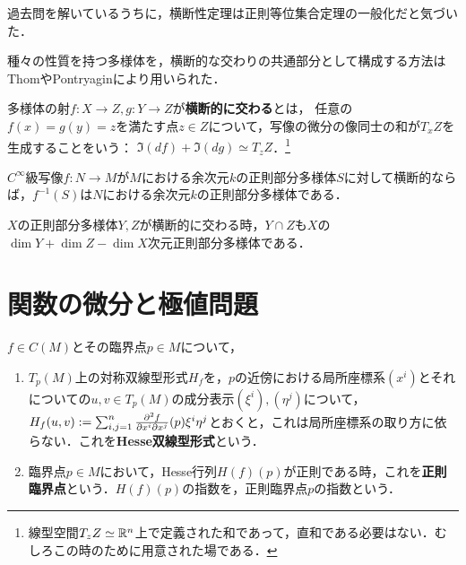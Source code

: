 \documentclass[uplatex,dvipdfmx]{jsreport}
\begin{document}
\begin{tcolorbox}[colframe=ForestGreen, colback=ForestGreen!10!white,breakable,colbacktitle=ForestGreen!40!white,coltitle=black,fonttitle=\bfseries\sffamily,
title=]
    過去問を解いているうちに，横断性定理は正則等位集合定理の一般化だと気づいた．
\end{tcolorbox}

\begin{tcolorbox}[colframe=ForestGreen, colback=ForestGreen!10!white,breakable,colbacktitle=ForestGreen!40!white,coltitle=black,fonttitle=\bfseries\sffamily,
    title=]
    種々の性質を持つ多様体を，横断的な交わりの共通部分として構成する方法はThomやPontryaginにより用いられた．
\end{tcolorbox}

\begin{definition}[transversality]
    多様体の射$f:X\to Z,g:Y\to Z$が\textbf{横断的に交わる}とは，
    任意の$f(x)=g(y)=z$を満たす点$z\in Z$について，写像の微分の像同士の和が$T_xZ$を生成することをいう：
    $\Im(df)+\Im(dg)\simeq T_zZ$．\footnote{線型空間$T_zZ\simeq\mathbb{R}^n$上で定義された和であって，直和である必要はない．むしろこの時のために用意された場である．}
\end{definition}

\begin{theorem}
    $C^\infty$級写像$f:N\to M$が$M$における余次元$k$の正則部分多様体$S$に対して横断的ならば，$f^{-1}(S)$は$N$における余次元$k$の正則部分多様体である．
\end{theorem}

\begin{theorem}
    $X$の正則部分多様体$Y,Z$が横断的に交わる時，$Y\cap Z$も$X$の$\dim Y+\dim Z-\dim X$次元正則部分多様体である．
\end{theorem}

\section{関数の微分と極値問題}

\begin{definition}
    $f\in C(M)$とその臨界点$p\in M$について，
    \begin{enumerate}
        \item $T_p(M)$上の対称双線型形式$H_f$を，$p$の近傍における局所座標系$(x^i)$とそれについての$u,v\in T_p(M)$の成分表示$(\xi^i),(\eta^j)$について，
        $H_f(u,v):=\sum^n_{i,j=1}\frac{\partial ^2f}{\partial x^i\partial x^j}(p)\xi^i\eta^j$とおくと，これは局所座標系の取り方に依らない．これを\textbf{Hesse双線型形式}という．
        \item 臨界点$p\in M$において，Hesse行列$H(f)(p)$が正則である時，これを\textbf{正則臨界点}という．$H(f)(p)$の指数を，正則臨界点$p$の指数という．
    \end{enumerate}
\end{definition}
\end{document}

